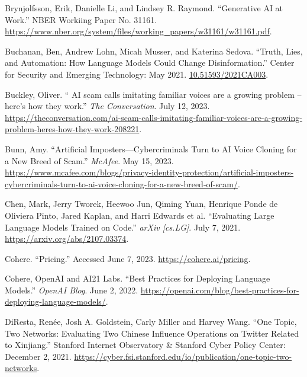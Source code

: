 \documentclass{article}
\begin{document}
\begin{thebibliography}{9}
  Brynjolfsson, Erik, Danielle Li, and Lindsey R. Raymond. ``Generative AI at Work.'' NBER Workiing Paper No. 31161. \href{https://www.nber.org/system/files/working_papers/w31161/w31161.pdf}{https://www.nber.org/system/files/working\_papers/w31161/w31161.pdf}.

  Buchanan, Ben, Andrew Lohn, Micah Musser, and Katerina Sedova. ``Truth, Lies, and Automation: How Language Models Could Change Disinformation.'' Center for Security and Emerging Technology: May 2021. \href{https://cset.georgetown.edu/publication/truth-lies-and-automation/}{10.51593/2021CA003}.

  Buckley, Oliver. `` AI scam calls imitating familiar voices are a growing problem – here’s how they work.'' \textit{The Conversation}. July 12, 2023. \href{https://theconversation.com/ai-scam-calls-imitating-familiar-voices-are-a-growing-problem-heres-how-they-work-208221}{https://theconversation.com/ai-scam-calls-imitating-familiar-voices-are-a-growing-problem-heres-how-they-work-208221}. 

  Bunn, Amy. ``Artificial Imposters—Cybercriminals Turn to AI Voice Cloning for a New Breed of Scam.'' \textit{McAfee}. May 15, 2023. \href{https://www.mcafee.com/blogs/privacy-identity-protection/artificial-imposters-cybercriminals-turn-to-ai-voice-cloning-for-a-new-breed-of-scam/}{https://www.mcafee.com/blogs/privacy-identity-protection/artificial-imposters-cybercriminals-turn-to-ai-voice-cloning-for-a-new-breed-of-scam/}. 

  Chen, Mark, Jerry Tworek, Heewoo Jun, Qiming Yuan, Henrique Ponde de Oliviera Pinto, Jared Kaplan, and Harri Edwards et al. ``Evaluating Large Language Models Trained on Code.'' \textit{arXiv [cs.LG]}. July 7, 2021. \href{https://arxiv.org/abs/2107.03374}{https://arxiv.org/abs/2107.03374}.

  Cohere. ``Pricing.'' Accessed June 7, 2023. \href{https://cohere.ai/pricing}{https://cohere.ai/pricing}.

  Cohere, OpenAI and AI21 Labs. ``Best Practices for Deploying Language Models.'' \textit{OpenAI Blog}. June 2, 2022. \href{https://openai.com/blog/best-practices-for-deploying-language-models/}{https://openai.com/blog/best-practices-for-deploying-language-models/}.

  DiResta, Renée, Josh A. Goldstein, Carly Miller and Harvey Wang. ``One Topic, Two Networks: Evaluating Two Chinese Influence Operations on Twitter Related to Xinjiang.'' Stanford Internet Observatory \& Stanford Cyber Policy Center: December 2, 2021. \href{https://cyber.fsi.stanford.edu/io/publication/one-topic-two-networks}{https://cyber.fsi.stanford.edu/io/publication/one-topic-two-networks}.


\end{thebibliography}
\end{document}
